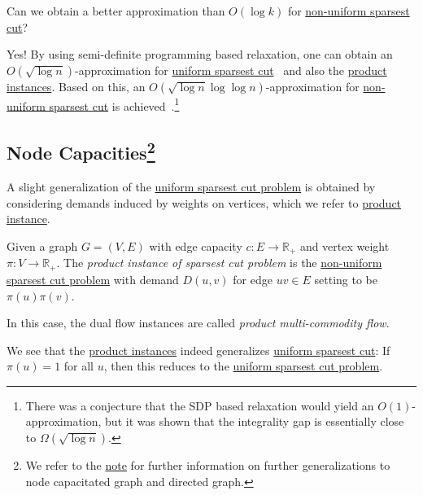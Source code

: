 \begin{problem*}\label{prb:SDP-sparsest-cut}
	Can we obtain a better approximation than \(O(\log k)\) for \hyperref[prb:non-uniform-sparsest-cut]{non-uniform sparsest cut}?
\end{problem*}
\begin{answer}
	Yes! By using semi-definite programming based relaxation, one can obtain an \(O(\sqrt{\log n} )\)-approximation for \hyperref[prb:sparsest-cut]{uniform sparsest cut}~\cite{arora2009expander} and also the \hyperref[prb:product-instance-of-sparsest-cut]{product instances}. Based on this, an \(O(\sqrt{\log n} \log \log n )\)-approximation for \hyperref[prb:non-uniform-sparsest-cut]{non-uniform sparsest cut} is achieved~\cite{arora2005euclidean,arora2007frechet}.\footnote{There was a conjecture that the SDP based relaxation would yield an \(O(1)\)-approximation, but it was shown that the integrality gap is essentially close to \(\Omega (\sqrt{\log n} )\).}
\end{answer}

\subsection{Node Capacities\footnote{We refer to the \href{https://courses.grainger.illinois.edu/cs598csc/fa2024/Notes/lec-sparsest-cut.pdf}{note} for further information on further generalizations to node capacitated graph and directed graph.}}
A slight generalization of the \hyperref[prb:sparsest-cut]{uniform sparsest cut problem} is obtained by considering demands induced by weights on vertices, which we refer to \hyperref[prb:product-instance-of-sparsest-cut]{product instance}.

\begin{problem}\label{prb:product-instance-of-sparsest-cut}
Given a graph \(G = (V, E)\) with edge capacity \(c \colon E \to \mathbb{R} _+\) and vertex weight \(\pi \colon V \to \mathbb{R} _+\). The \emph{product instance of sparsest cut problem} is the \hyperref[prb:non-uniform-sparsest-cut]{non-uniform sparsest cut problem} with demand \(D(u, v)\) for edge \(uv \in E\) setting to be \(\pi (u) \pi (v)\).
\end{problem}

\begin{notation}
	In this case, the dual flow instances are called \emph{product multi-commodity flow}.
\end{notation}

We see that the \hyperref[prb:product-instance-of-sparsest-cut]{product instances} indeed generalizes \hyperref[prb:sparsest-cut]{uniform sparsest cut}: If \(\pi (u) = 1\) for all \(u\), then this reduces to the \hyperref[prb:sparsest-cut]{uniform sparsest cut problem}.

